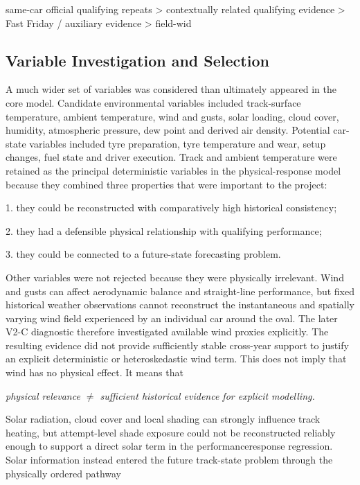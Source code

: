 same-car official qualifying repeats > contextually related qualifying evidence > Fast Friday / auxiliary evidence > field-wid

\subsection{Variable Investigation and Selection}
A much wider set of variables was considered than ultimately appeared in the core model. Candidate environmental variables included track-surface temperature, ambient temperature, wind and gusts, solar loading, cloud cover, humidity, atmospheric pressure, dew point and derived air density. Potential car-state variables included tyre preparation, tyre temperature and wear, setup changes, fuel state and driver execution. Track and ambient temperature were retained as the principal deterministic variables in the physical-response model because they combined three properties that were important to the project:

1. they could be reconstructed with comparatively high historical consistency;

2. they had a defensible physical relationship with qualifying performance;

3. they could be connected to a future-state forecasting problem.

Other variables were not rejected because they were physically irrelevant. Wind and gusts can affect aerodynamic balance and straight-line performance, but fixed historical weather observations cannot reconstruct the instantaneous and spatially varying wind field experienced by an individual car around the oval. The later V2-C diagnostic therefore investigated available wind proxies explicitly. The resulting evidence did not provide sufficiently stable cross-year support to justify an explicit deterministic or heteroskedastic wind term. This does not imply that wind has no physical effect. It means that

\begin{center}\textit{physical relevance \ensuremath{\neq} sufficient historical evidence for explicit modelling.}\end{center}

Solar radiation, cloud cover and local shading can strongly influence track heating, but attempt-level shade exposure could not be reconstructed reliably enough to support a direct solar term in the performanceresponse regression. Solar information instead entered the future track-state problem through the physically ordered pathway


